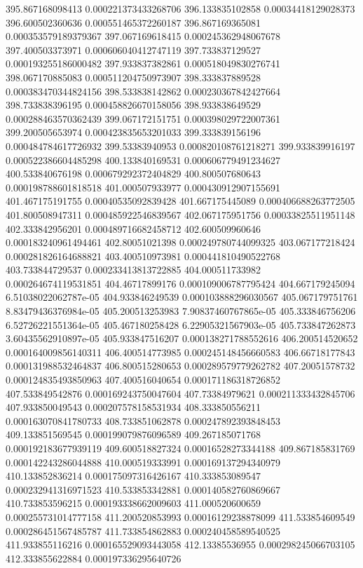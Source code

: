 {395.867168098413 0.000221373433268706
396.133835102858 0.00034418129028373
396.600502360636 0.000551465372260187
396.867169365081 0.000353579189379367
397.067169618415 0.000245362948067678
397.400503373971 0.000606040412747119
397.733837129527 0.000193255186000482
397.933837382861 0.000518049830276741
398.067170885083 0.000511204750973907
398.333837889528 0.000383470344824156
398.533838142862 0.000230367842427664
398.733838396195 0.000458826670158056
398.933838649529 0.000288463570362439
399.067172151751 0.000398029722007361
399.200505653974 0.000423835653201033
399.333839156196 0.000484784617726932
399.53383940953 0.000820108761218271
399.933839916197 0.000522386604485298
400.133840169531 0.000606779491234627
400.533840676198 0.000679292372404829
400.800507680643 0.000198788601818518
401.000507933977 0.000430912907155691
401.467175191755 0.00040535092839428
401.667175445089 0.000406688263772505
401.800508947311 0.000485922546839567
402.067175951756 0.00033825511951148
402.333842956201 0.000489716682458712
402.600509960646 0.000183240961494461
402.80051021398 0.000249780744099325
403.067177218424 0.000281826164688821
403.400510973981 0.000441810490522768
403.733844729537 0.000233413813722885
404.000511733982 0.000264674119531851
404.46717899176 0.000109006787795424
404.667179245094 6.51038022062787e-05
404.933846249539 0.000103888296030567
405.067179751761 8.83479436376984e-05
405.200513253983 7.90837460767865e-05
405.333846756206 6.52726221551364e-05
405.467180258428 6.22905321567903e-05
405.733847262873 3.60435562910897e-05
405.933847516207 0.000138271788552616
406.200514520652 0.000164009856140311
406.400514773985 0.000245148456660583
406.66718177843 0.000131988532464837
406.800515280653 0.000289579779262782
407.20051578732 0.000124835493850963
407.400516040654 0.000171186318726852
407.533849542876 0.000169243750047604
407.73384979621 0.000211333432845706
407.933850049543 0.000207578158531934
408.333850556211 0.000163070841780733
408.733851062878 0.000247892393848453
409.133851569545 0.000199079876096589
409.267185071768 0.000192183677939119
409.600518827324 0.00016528273344188
409.867185831769 0.000142243286044888
410.000519333991 0.000169137294340979
410.133852836214 0.000175097316426167
410.333853089547 0.000232941316971523
410.533853342881 0.000140582760869667
410.733853596215 0.000193338662009603
411.000520600659 0.000255731014777158
411.200520853993 0.00016129238878099
411.533854609549 0.000286451567485787
411.733854862883 0.000240458589540525
411.933855116216 0.000165529093443058
412.13385536955 0.000298245066703105
412.333855622884 0.000197336295640726
}
